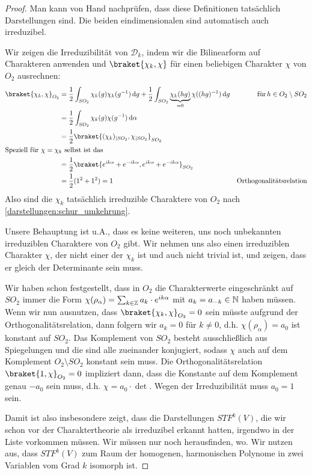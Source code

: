 \begin{proof}
Man kann von Hand nachprüfen, dass diese Definitionen tatsächlich Darstellungen sind. Die beiden eindimensionalen sind automatisch auch irreduzibel.

Wir zeigen die Irreduzibilität von $\mathcal{D}_k$, indem wir die Bilinearform auf Charakteren anwenden und $\braket{\chi_k,\chi}$ für einen beliebigen Charakter $\chi$ von $O_2$ ausrechnen:
\begin{align*}
\braket{\chi_k,\chi}_{O_2} &= \frac{1}{2}\int_{SO_2} \chi_k(g)\chi_k(g^{-1}) \dd g + \frac{1}{2}\int_{SO_2} \underbrace{\chi_k(hg)}_{=0}\chi((hg)^{-1})\dd g &\text{für}\,h\in O_2\setminus SO_2\\
&= \frac{1}{2}\int_{SO_2} \chi_k(g)\chi(g^{-1}) \dd \alpha \\
&= \frac{1}{2} \braket{ (\chi_k)_{|SO_2} , \chi_{|SO_2}}_{SO_2} \\
\intertext{Speziell für $\chi=\chi_k$ selbst ist das}
&= \frac{1}{2} \braket{e^{ik\alpha} + e^{-ik\alpha}, e^{ik\alpha} + e^{-ik\alpha}}_{SO_2} \\
&=\frac{1}{2}(1^2 + 1^2)=1 &\text{Orthogonalitätsrelation}
\end{align*}
Also sind die $\chi_k$ tatsächlich irreduzible Charaktere von $O_2$ nach \ref{darstellungen:schur_umkehrung}.

\medbreak
Unsere Behauptung ist u.A., dass es keine weiteren, uns noch unbekannten irreduziblen Charaktere von $O_2$ gibt. Wir nehmen uns also einen irreduziblen Charakter $\chi$, der nicht einer der $\chi_k$ ist und auch nicht trivial ist, und zeigen, dass er gleich der Determinante sein muss.

\smallbreak
Wir haben schon festgestellt, dass in $O_2$ die Charakterwerte eingeschränkt auf $SO_2$ immer die Form $\chi(\rho_\alpha) = \sum_{k\in\mathbb{Z}} a_k\cdot  e^{ik\alpha}$ mit $a_k=a_{-k}\in\mathbb{N}$ haben müssen. Wenn wir nun ausnutzen, dass $\braket{\chi_k,\chi}_{O_2}=0$ sein müsste aufgrund der Orthogonalitätsrelation, dann folgern wir $a_k=0$ für $k\neq 0$, d.h. $\chi(\rho_\alpha)=a_0$ ist konstant auf $SO_2$. Das Komplement von $SO_2$ besteht ausschließlich aus Spiegelungen und die sind alle zueinander konjugiert, sodass $\chi$ auch auf dem Komplement $O_2\setminus SO_2$ konstant sein muss. Die Orthogonalitätsrelation $\braket{1,\chi}_{O_2}=0$ impliziert dann, dass die Konstante auf dem Komplement genau $-a_0$ sein muss, d.h. $\chi = a_0\cdot \det$. Wegen der Irreduzibilität muss $a_0=1$ sein.

\medbreak
Damit ist also insbesondere zeigt, dass die Darstellungen $STF^k(V)$, die wir schon vor der Charaktertheorie als irreduzibel erkannt hatten, irgendwo in der Liste vorkommen müssen. Wir müssen nur noch herausfinden, wo. Wir nutzen aus, dass $STF^k(V)$ zum Raum der homogenen, harmonischen Polynome in zwei Variablen vom Grad $k$ isomorph ist.


\end{proof}
